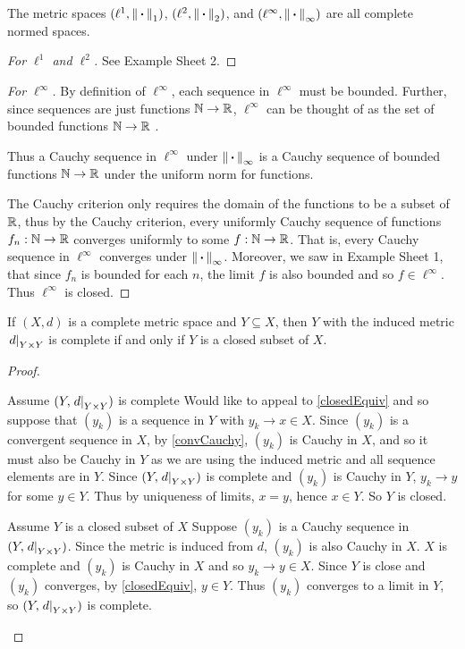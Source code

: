 \documentclass[../main.tex]{subfiles}
\begin{document}
\begin{theorem}
  The metric spaces $(\ell^1, \left\lVert {\hspace{0.18em}\boldsymbol{\cdot}\hspace{0.18em}} \right\rVert_1)$, $(\ell^2, \left\lVert {\hspace{0.18em}\boldsymbol{\cdot}\hspace{0.18em}} \right\rVert_2)$, and $(\ell^{\infty}, \left\lVert {\hspace{0.18em}\boldsymbol{\cdot}\hspace{0.18em}} \right\rVert_{\infty})$ are all complete normed spaces. \label{lComp}
\end{theorem}
\begin{proof}[For $\ell^1$ and $\ell^2$]
  See Example Sheet 2.
\end{proof}
\begin{proof}[For $\ell^\infty$]
  By definition of $\ell^{\infty}$, each sequence in $\ell^{\infty}$ must be bounded.
  Further, since sequences are just functions $\mathbb{N} \to \mathbb{R}$, $\ell^{\infty}$ can be thought of as the set of bounded functions $\mathbb{N} \to \mathbb{R}$ .

  Thus a Cauchy sequence in $\ell^{\infty}$ under $\left\lVert {\hspace{0.18em}\boldsymbol{\cdot}\hspace{0.18em}} \right\rVert_{\infty}$ is a Cauchy sequence of bounded functions $\mathbb{N} \to \mathbb{R}$ under the uniform norm for functions.

  The Cauchy criterion only requires the domain of the functions to be a subset of $\mathbb{R}$, thus by the Cauchy criterion, every uniformly Cauchy sequence of functions $f_n: \mathbb{N} \to \mathbb{R}$ converges uniformly to some $f: \mathbb{N} \to \mathbb{R}$.
  That is, every Cauchy sequence in $\ell^{\infty}$ converges under $\left\lVert {\hspace{0.18em}\boldsymbol{\cdot}\hspace{0.18em}} \right\rVert_{\infty}$.
  Moreover, we saw in Example Sheet 1, that since $f_n$ is bounded for each $n$, the limit $f$ is also bounded and so $f \in \ell^{\infty}$.
  Thus $\ell^{\infty}$ is closed.
\end{proof}
\begin{theorem}
  If $(X, d)$ is a complete metric space and $Y \subseteq X$, then $Y$ with the induced metric $\left. d \right|_{Y \times Y}$ is complete if and only if $Y$ is a closed subset of $X$. \label{compClosed}
\end{theorem}
\begin{proof}
  \begin{proofdirection}{Assume $(Y, \left. d \right|_{Y\times Y})$ is complete}
    Would like to appeal to \cref{closedEquiv} and so suppose that $(y_k)$ is a sequence in $Y$ with $y_k \to x \in X$.
    Since $(y_k)$ is a convergent sequence in $X$, by \cref{convCauchy}, $(y_k)$ is Cauchy in $X$, and so it must also be Cauchy in $Y$ as we are using the induced metric and all sequence elements are in $Y$.
    Since $(Y, \left. d \right|_{Y\times Y})$ is complete and $(y_k)$ is Cauchy in $Y$, $y_k \to y$ for some $y \in Y$.
    Thus by uniqueness of limits, $x = y$, hence $x \in Y$.
    So $Y$ is closed.
  \end{proofdirection}
  \begin{proofdirection}{Assume $Y$ is a closed subset of $X$}
    Suppose $(y_k)$ is a Cauchy sequence in $(Y, \left. d \right|_{Y \times Y})$.
    Since the metric is induced from $d$, $(y_k)$ is also Cauchy in $X$.
    $X$ is complete and $(y_k)$ is Cauchy in $X$ and so $y_k \to y \in X$.
    Since $Y$ is close and $(y_k)$ converges, by \cref{closedEquiv}, $y \in Y$.
    Thus $(y_k)$ converges to a limit in $Y$, so $(Y, \left. d \right|_{Y \times Y})$ is complete.
  \end{proofdirection}
\end{proof}
\end{document}
